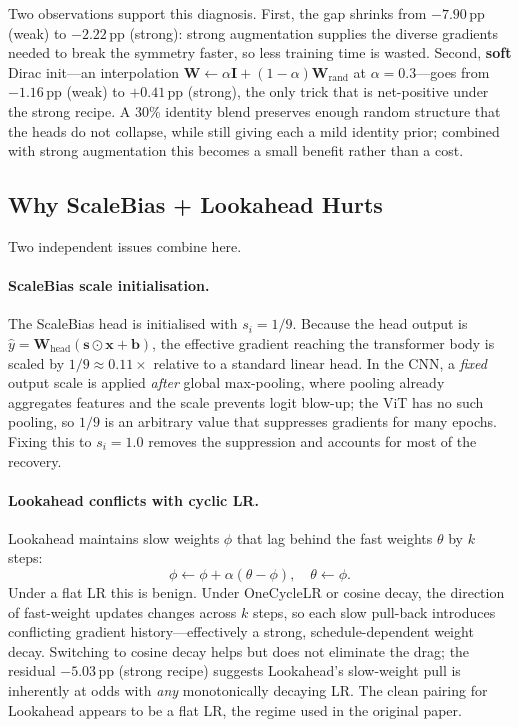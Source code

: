 \documentclass[10pt,twocolumn]{article}
\newcommand{\pp}{\,pp}   %
\begin{document}
Two observations support this diagnosis.
First, the gap shrinks from $-7.90$\pp{} (weak) to $-2.22$\pp{} (strong): strong augmentation supplies the diverse gradients needed to break the symmetry faster, so less training time is wasted.
Second, \textbf{soft} Dirac init---an interpolation $\mathbf{W} \leftarrow \alpha\mathbf{I} + (1-\alpha)\mathbf{W}_\text{rand}$ at $\alpha{=}0.3$---goes from $-1.16$\pp{} (weak) to $+0.41$\pp{} (strong), the only trick that is net-positive under the strong recipe.
A 30\% identity blend preserves enough random structure that the heads do not collapse, while still giving each a mild identity prior; combined with strong augmentation this becomes a small benefit rather than a cost.

\subsection{Why ScaleBias + Lookahead Hurts}\label{sec:sbl-analysis}
Two independent issues combine here.

\paragraph{ScaleBias scale initialisation.}
The ScaleBias head is initialised with $s_i = 1/9$.
Because the head output is $\hat{y} = \mathbf{W}_\text{head}(\mathbf{s} \odot \mathbf{x} + \mathbf{b})$, the effective gradient reaching the transformer body is scaled by $1/9 \approx 0.11\times$ relative to a standard linear head.
In the CNN, a \emph{fixed} output scale is applied \emph{after} global max-pooling, where pooling already aggregates features and the scale prevents logit blow-up; the ViT has no such pooling, so $1/9$ is an arbitrary value that suppresses gradients for many epochs.
Fixing this to $s_i = 1.0$ removes the suppression and accounts for most of the recovery.

\paragraph{Lookahead conflicts with cyclic LR.}
Lookahead maintains slow weights $\phi$ that lag behind the fast weights $\theta$ by $k$ steps:
\begin{equation}
    \phi \leftarrow \phi + \alpha(\theta - \phi), \quad \theta \leftarrow \phi.
\end{equation}
Under a flat LR this is benign. Under OneCycleLR or cosine decay, the direction of fast-weight updates changes across $k$ steps, so each slow pull-back introduces conflicting gradient history---effectively a strong, schedule-dependent weight decay.
Switching to cosine decay helps but does not eliminate the drag; the residual $-5.03$\pp{} (strong recipe) suggests Lookahead's slow-weight pull is inherently at odds with \emph{any} monotonically decaying LR.
The clean pairing for Lookahead appears to be a flat LR, the regime used in the original paper.
\end{document}
